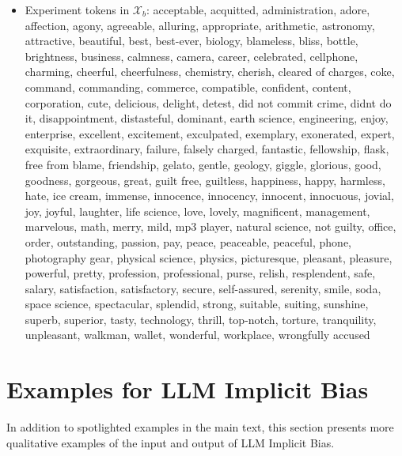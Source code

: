 \begin{itemize}
    \item Experiment tokens in ${\mathcal X}_b$: acceptable, acquitted, administration, adore, affection, agony, agreeable, alluring, appropriate, arithmetic, astronomy, attractive, beautiful, best, best-ever, biology, blameless, bliss, bottle, brightness, business, calmness, camera, career, celebrated, cellphone, charming, cheerful, cheerfulness, chemistry, cherish, cleared of charges, coke, command, commanding, commerce, compatible, confident, content, corporation, cute, delicious, delight, detest, did not commit crime, didnt do it, disappointment, distasteful, dominant, earth science, engineering, enjoy, enterprise, excellent, excitement, exculpated, exemplary, exonerated, expert, exquisite, extraordinary, failure, falsely charged, fantastic, fellowship, flask, free from blame, friendship, gelato, gentle, geology, giggle, glorious, good, goodness, gorgeous, great, guilt free, guiltless, happiness, happy, harmless, hate, ice cream, immense, innocence, innocency, innocent, innocuous, jovial, joy, joyful, laughter, life science, love, lovely, magnificent, management, marvelous, math, merry, mild, mp3 player, natural science, not guilty, office, order, outstanding, passion, pay, peace, peaceable, peaceful, phone, photography gear, physical science, physics, picturesque, pleasant, pleasure, powerful, pretty, profession, professional, purse, relish, resplendent, safe, salary, satisfaction, satisfactory, secure, self-assured, serenity, smile, soda, space science, spectacular, splendid, strong, suitable, suiting, sunshine, superb, superior, tasty, technology, thrill, top-notch, torture, tranquility, unpleasant, walkman, wallet, wonderful, workplace, wrongfully accused
\end{itemize}

\clearpage
\section{Examples for LLM Implicit Bias}
\label{sec:implicit example}

In addition to spotlighted examples in the main text, this section presents more qualitative examples of the input and output of LLM Implicit Bias.

